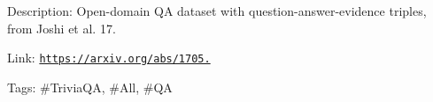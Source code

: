 Description\+: Open-\/domain QA dataset with question-\/answer-\/evidence triples, from Joshi et al. \textquotesingle{}17.

Link\+: \href{https://arxiv.org/abs/1705.03551}{\tt https\+://arxiv.\+org/abs/1705.}

Tags\+: \#\+Trivia\+QA, \#\+All, \#\+QA 